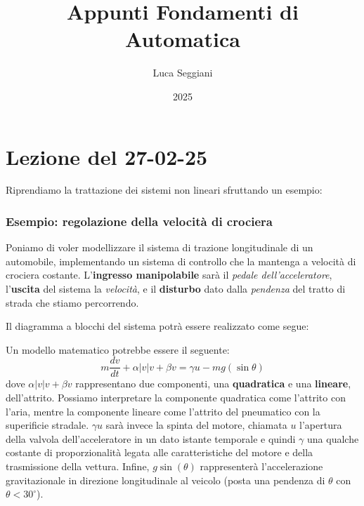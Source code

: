 \documentclass[a4paper,11pt]{article}
\title{Appunti Fondamenti di Automatica}
\author{Luca Seggiani}
\date{2025}
\begin{document}
\section{Lezione del 27-02-25}

\thispagestyle{empty}
\pagestyle{fancy}

Riprendiamo la trattazione dei sistemi non lineari sfruttando un esempio:

\subsubsection{Esempio: regolazione della velocità di crociera}
Poniamo di voler modellizzare il sistema di trazione longitudinale di un automobile, implementando un sistema di controllo che la mantenga a velocità di crociera costante.
L'\textbf{ingresso manipolabile} sarà il \textit{pedale dell'acceleratore}, l'\textbf{uscita} del sistema la \textit{velocità}, e il \textbf{disturbo} dato dalla \textit{pendenza} del tratto di strada che stiamo percorrendo.

Il diagramma a blocchi del sistema potrà essere realizzato come segue:

\begin{center}
\end{center}

Un modello matematico potrebbe essere il seguente:
$$
m \frac{dv}{dt} + \alpha |v|v + \beta v = \gamma u - m g (\sin{\theta})
$$
dove $\alpha |v|v + \beta v$ rappresentano due componenti, una \textbf{quadratica} e una \textbf{lineare}, dell'attrito.
Possiamo interpretare la componente quadratica come l'attrito con l'aria, mentre la componente lineare come l'attrito del pneumatico con la superificie stradale.
$\gamma u$ sarà invece la spinta del motore, chiamata $u$ l'apertura della valvola dell'acceleratore in un dato istante temporale e quindi $\gamma$ una qualche costante di proporzionalità legata alle caratteristiche del motore e della trasmissione della vettura.
Infine, $g\sin(\theta)$ rappresenterà l'accelerazione gravitazionale in direzione longitudinale al veicolo (posta una pendenza di $\theta$ con $\theta < 30^\circ$).
\end{document}
